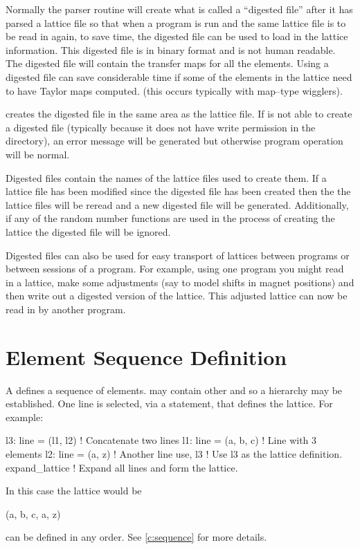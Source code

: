 Normally the \bmad parser routine will create what is called a
``digested file'' after it has parsed a lattice file so that when a
program is run and the same lattice file is to be read in again, to save
time, the digested file can be used to load in the lattice information.
This digested file is in binary format and is not human readable. The
digested file will contain the transfer maps for all the elements. 
Using a digested file can save considerable time if some of the
elements in the lattice need to have Taylor maps computed.
(this occurs typically with map--type wigglers).

\bmad creates the digested file in the same area as the lattice file.
If \bmad is not able to create a digested file (typically because it
does not have write permission in the directory), an error message will
be generated but otherwise program operation will be normal.

Digested files contain the names of the lattice files used to create
them. If a lattice file has been modified since the digested file has
been created then the the lattice files will be reread and a new
digested file will be generated. Additionally, if any of the random
number functions are used in the process of creating the lattice the
digested file will be ignored.

Digested files can also be used for easy transport of lattices between
programs or between sessions of a program. For example, using one
program you might read in a lattice, make some adjustments (say to model
shifts in magnet positions) and then write out a digested version of the
lattice. This adjusted lattice can now be read in by another program.

\section{Element Sequence Definition}

A  defines a sequence of elements.  may contain
other  and so a hierarchy may be established. One line is
selected, via a  statement, that defines the lattice. For
example:
\begin{example}
  l3: line = (l1, l2)   ! Concatenate two lines
  l1: line = (a, b, c)  ! Line with 3 elements
  l2: line = (a, z)     ! Another line 
  use, l3               ! Use l3 as the lattice definition.
  expand_lattice        ! Expand all lines and form the lattice.
\end{example}
In this case the lattice would be
\begin{example}
  (a, b, c, a, z)
\end{example}
 can be defined in any order. See \cref{c:sequence} for more
details.

